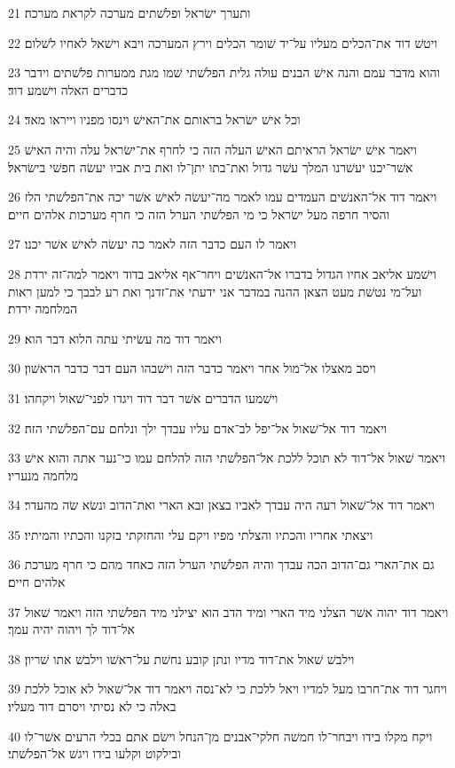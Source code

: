 \par 21 ותערך ישׂראל ופלשׁתים מערכה לקראת מערכה׃
\par 22 ויטשׁ דוד את־הכלים מעליו על־יד שׁומר הכלים וירץ המערכה ויבא וישׁאל לאחיו לשׁלום׃
\par 23 והוא מדבר עמם והנה אישׁ הבנים עולה גלית הפלשׁתי שׁמו מגת ממערות פלשׁתים וידבר כדברים האלה וישׁמע דוד׃
\par 24 וכל אישׁ ישׂראל בראותם את־האישׁ וינסו מפניו וייראו מאד׃
\par 25 ויאמר אישׁ ישׂראל הראיתם האישׁ העלה הזה כי לחרף את־ישׂראל עלה והיה האישׁ אשׁר־יכנו יעשׁרנו המלך עשׁר גדול ואת־בתו יתן־לו ואת בית אביו יעשׂה חפשׁי בישׂראל׃
\par 26 ויאמר דוד אל־האנשׁים העמדים עמו לאמר מה־יעשׂה לאישׁ אשׁר יכה את־הפלשׁתי הלז והסיר חרפה מעל ישׂראל כי מי הפלשׁתי הערל הזה כי חרף מערכות אלהים חיים׃
\par 27 ויאמר לו העם כדבר הזה לאמר כה יעשׂה לאישׁ אשׁר יכנו׃
\par 28 וישׁמע אליאב אחיו הגדול בדברו אל־האנשׁים ויחר־אף אליאב בדוד ויאמר למה־זה ירדת ועל־מי נטשׁת מעט הצאן ההנה במדבר אני ידעתי את־זדנך ואת רע לבבך כי למען ראות המלחמה ירדת׃
\par 29 ויאמר דוד מה עשׂיתי עתה הלוא דבר הוא׃
\par 30 ויסב מאצלו אל־מול אחר ויאמר כדבר הזה וישׁבהו העם דבר כדבר הראשׁון׃
\par 31 וישׁמעו הדברים אשׁר דבר דוד ויגדו לפני־שׁאול ויקחהו׃
\par 32 ויאמר דוד אל־שׁאול אל־יפל לב־אדם עליו עבדך ילך ונלחם עם־הפלשׁתי הזה׃
\par 33 ויאמר שׁאול אל־דוד לא תוכל ללכת אל־הפלשׁתי הזה להלחם עמו כי־נער אתה והוא אישׁ מלחמה מנעריו׃
\par 34 ויאמר דוד אל־שׁאול רעה היה עבדך לאביו בצאן ובא הארי ואת־הדוב ונשׂא שׂה מהעדר׃
\par 35 ויצאתי אחריו והכתיו והצלתי מפיו ויקם עלי והחזקתי בזקנו והכתיו והמיתיו׃
\par 36 גם את־הארי גם־הדוב הכה עבדך והיה הפלשׁתי הערל הזה כאחד מהם כי חרף מערכת אלהים חיים׃
\par 37 ויאמר דוד יהוה אשׁר הצלני מיד הארי ומיד הדב הוא יצילני מיד הפלשׁתי הזה ויאמר שׁאול אל־דוד לך ויהוה יהיה עמך׃
\par 38 וילבשׁ שׁאול את־דוד מדיו ונתן קובע נחשׁת על־ראשׁו וילבשׁ אתו שׁריון׃
\par 39 ויחגר דוד את־חרבו מעל למדיו ויאל ללכת כי לא־נסה ויאמר דוד אל־שׁאול לא אוכל ללכת באלה כי לא נסיתי ויסרם דוד מעליו׃
\par 40 ויקח מקלו בידו ויבחר־לו חמשׁה חלקי־אבנים מן־הנחל וישׂם אתם בכלי הרעים אשׁר־לו ובילקוט וקלעו בידו ויגשׁ אל־הפלשׁתי׃

